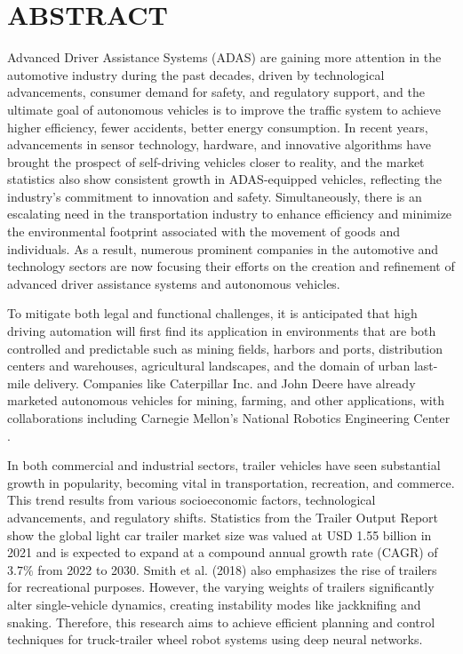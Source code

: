 \chapter*{\Large \uppercase{Abstract}}
\label{chap:Abstract}

Advanced Driver Assistance Systems (ADAS) are gaining more attention in the automotive industry during the past decades, driven by technological advancements, consumer demand for safety, and regulatory support, and the ultimate goal of autonomous vehicles is to improve the traffic system to achieve higher efficiency, fewer accidents, better energy consumption. In recent years, advancements in sensor technology, hardware, and innovative algorithms have brought the prospect of self-driving vehicles closer to reality, and the market statistics also show consistent growth in ADAS-equipped vehicles, reflecting the industry's commitment to innovation and safety. Simultaneously, there is an escalating need in the transportation industry to enhance efficiency and minimize the environmental footprint associated with the movement of goods and individuals. As a result, numerous prominent companies in the automotive and technology sectors are now focusing their efforts on the creation and refinement of advanced driver assistance systems and autonomous vehicles. 

To mitigate both legal and functional challenges, it is anticipated that high driving automation will first find its application in environments that are both controlled and predictable such as mining fields, harbors and ports, distribution centers and warehouses, agricultural landscapes, and the domain of urban last-mile delivery. Companies like Caterpillar Inc. and John Deere have already marketed autonomous vehicles for mining, farming, and other applications, with collaborations including Carnegie Mellon’s National Robotics Engineering Center \parencite{Koenig_heavy_truck_AD}.

In both commercial and industrial sectors, trailer vehicles have seen substantial growth in popularity, becoming vital in transportation, recreation, and commerce. This trend results from various socioeconomic factors, technological advancements, and regulatory shifts. Statistics from the Trailer Output Report show the global light car trailer market size was valued at USD 1.55 billion in 2021 and is expected to expand at a compound annual growth rate (CAGR) of $3.7\%$ from 2022 to 2030. Smith et al. (2018) also emphasizes the rise of trailers for recreational purposes. However,  the varying weights of trailers significantly alter single-vehicle dynamics, creating instability modes like jackknifing and snaking. Therefore, this research aims to achieve efficient planning and control techniques for truck-trailer wheel robot systems using deep neural networks.

